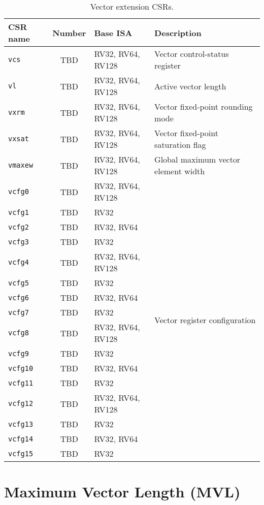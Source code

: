 \begin{table}[hbt]
  \centering
  \begin{tabular}{|l|c|l|l|}
    \hline
    CSR name & Number & Base ISA & Description\\
    \hline
    {\tt vcs}  & TBD & RV32, RV64, RV128 & Vector control-status register\\
    {\tt vl}    & TBD & RV32, RV64, RV128 & Active vector length\\
    {\tt vxrm}  & TBD & RV32, RV64, RV128 & Vector fixed-point rounding mode\\
    {\tt vxsat} & TBD & RV32, RV64, RV128 & Vector fixed-point
    saturation flag \\
    {\tt vmaxew} & TBD & RV32, RV64, RV128 & Global maximum vector element width \\
    \hline
    {\tt vcfg0} & TBD & RV32, RV64, RV128 & \multirow{16}{*}{Vector
      register configuration}\\
    {\tt vcfg1} & TBD & RV32 &\\
    {\tt vcfg2} & TBD & RV32, RV64 &\\
    {\tt vcfg3} & TBD & RV32 &\\
    {\tt vcfg4}  & TBD & RV32, RV64, RV128 &\\
    {\tt vcfg5} & TBD & RV32 &\\
    {\tt vcfg6} & TBD & RV32, RV64 &\\
    {\tt vcfg7} & TBD & RV32 &\\
    {\tt vcfg8} & TBD & RV32, RV64, RV128 & \\
    {\tt vcfg9} & TBD & RV32 &\\
    {\tt vcfg10} & TBD & RV32, RV64 &\\
    {\tt vcfg11} & TBD & RV32 &\\
    {\tt vcfg12}  & TBD & RV32, RV64, RV128 &\\
    {\tt vcfg13} & TBD & RV32 &\\
    {\tt vcfg14} & TBD & RV32, RV64 &\\
    {\tt vcfg15} & TBD & RV32 &\\
    \hline
  \end{tabular}
  \caption{Vector extension CSRs.}
  \label{tab:vcsrs}
\end{table}

\clearpage

\section{Maximum Vector Length (MVL)}

